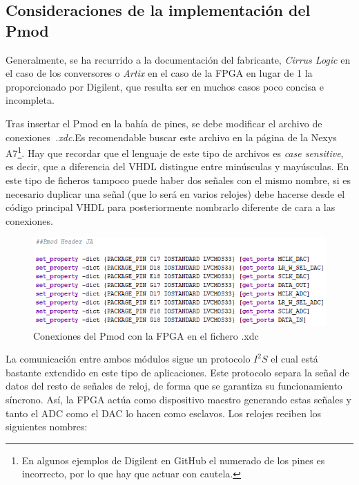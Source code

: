 \subsection{Consideraciones de la implementación del Pmod}
Generalmente, se ha recurrido a la documentación del fabricante, \emph{Cirrus Logic} en el caso de los conversores o \emph{Artix} en el caso de la FPGA en lugar de 1 la proporcionado por Digilent, que resulta ser en muchos casos poco concisa e incompleta.

Tras insertar el Pmod en la bahía de pines, se debe modificar el archivo de conexiones~\emph{.xdc}.Es recomendable buscar este archivo en la página de la Nexys A7\footnote{En algunos ejemplos de Digilent en GitHub el numerado de los pines es incorrecto, por lo que hay que actuar con cautela.}. Hay que recordar que el lenguaje de este tipo de archivos es \emph{case sensitive}, es decir, que a diferencia del VHDL distingue entre minúsculas y mayúsculas. En este tipo de ficheros tampoco puede haber dos señales con el mismo nombre, si es necesario duplicar una señal (que lo será en varios relojes) debe hacerse desde el código principal VHDL para posteriormente nombrarlo diferente de cara a las conexiones. 

\begin{figure}[!ht]
\begin{center}
\includegraphics[width=12cm]{img/xdc.png}
\caption{\label{fig:xdc}Conexiones del Pmod con la FPGA en el fichero .xdc}
\end{center}
\end{figure}

La comunicación entre ambos módulos sigue un protocolo $I^{2}S$ \cite{i2s} el cual está bastante extendido en este tipo de aplicaciones. Este protocolo separa la señal de datos del resto de señales de reloj, de forma que se garantiza su funcionamiento síncrono. Así, la FPGA actúa como dispositivo maestro generando estas señales y tanto el ADC como el DAC lo hacen como esclavos. Los relojes reciben los siguientes nombres:

